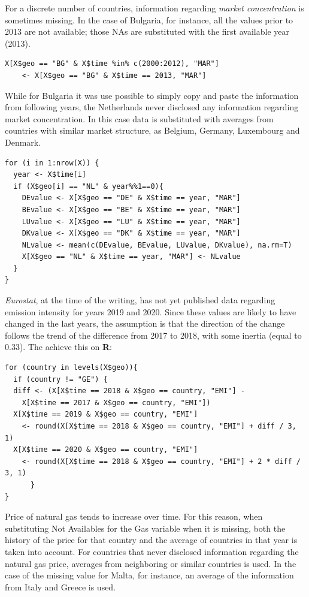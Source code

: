 \documentclass[a4paper,12pt]{book}
\begin{document}
\begin{appendices}
For a discrete number of countries, information regarding \textit{market concentration} is sometimes missing. In the case of Bulgaria, for instance, all the values prior to 2013 are not available; those NAs are substituted with the first available year (2013).

\begin{verbatim}
X[X$geo == "BG" & X$time %in% c(2000:2012), "MAR"] 
	<- X[X$geo == "BG" & X$time == 2013, "MAR"]
\end{verbatim}

While for Bulgaria it was use possible to simply copy and paste the information from following years, the Netherlands never disclosed any information regarding market concentration. In this case data is substituted with averages from countries with similar market structure, as Belgium, Germany, Luxembourg and Denmark.

\begin{verbatim}
for (i in 1:nrow(X)) {
  year <- X$time[i]
  if (X$geo[i] == "NL" & year%%1==0){
    DEvalue <- X[X$geo == "DE" & X$time == year, "MAR"]
    BEvalue <- X[X$geo == "BE" & X$time == year, "MAR"]
    LUvalue <- X[X$geo == "LU" & X$time == year, "MAR"]
    DKvalue <- X[X$geo == "DK" & X$time == year, "MAR"]
    NLvalue <- mean(c(DEvalue, BEvalue, LUvalue, DKvalue), na.rm=T)
    X[X$geo == "NL" & X$time == year, "MAR"] <- NLvalue
  }
}
\end{verbatim}

\textit{Eurostat}, at the time of the writing, has not yet published data regarding emission intensity for years 2019 and 2020. Since these values are likely to have changed in the last years, the assumption is that the direction of the change follows the trend of the difference from 2017 to 2018, with some inertia (equal to 0.33). The achieve this on \textbf{R}:

\begin{verbatim}
for (country in levels(X$geo)){
  if (country != "GE") {
  diff <- (X[X$time == 2018 & X$geo == country, "EMI"] -
	X[X$time == 2017 & X$geo == country, "EMI"])
  X[X$time == 2019 & X$geo == country, "EMI"] 
	<- round(X[X$time == 2018 & X$geo == country, "EMI"] + diff / 3, 1)
  X[X$time == 2020 & X$geo == country, "EMI"]
	<- round(X[X$time == 2018 & X$geo == country, "EMI"] + 2 * diff / 3, 1)
	  }
}
\end{verbatim}

Price of natural gas tends to increase over time. For this reason, when substituting Not Availables for the Gas variable when it is missing, both the history of the price for that country and the average of countries in that year is taken into account. For countries that never disclosed information regarding the natural gas price, averages from neighboring or similar countries is used. In the case of the missing value for Malta, for instance, an average of the information from Italy and Greece is used.


\end{appendices}
\end{document}
